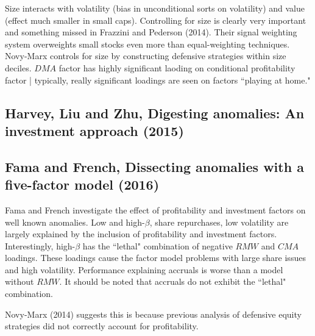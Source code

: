 Size interacts with volatility (bias in unconditional sorts on volatility) and value
(effect much smaller in small caps). Controlling for size is clearly very important and
something missed in Frazzini and Pederson (2014). Their signal weighting system
overweights small stocks even more than equal-weighting techniques. Novy-Marx controls for
size by constructing defensive strategies within size deciles. $DMA$ factor has highly
significant laoding on conditional profitability factor | typically, really significant
loadings are seen on factors ``playing at home."

\subsection[Harvey, Liu and Zhu, 2015]{Harvey, Liu and Zhu, Digesting anomalies: An investment approach (2015)\cite{harvey2015digesting}}

\subsection[Fama and French, 2016]{Fama and French, Dissecting anomalies with a five-factor model (2016)\cite{fama2016dissecting}}

Fama and French investigate the effect of profitability and investment factors on well
known anomalies. Low and high-$\beta$, share repurchases, low volatility are largely
explained by the inclusion of profitability and investment factors. Interestingly,
high-$\beta$ has the ``lethal" combination of negative $RMW$ and $CMA$ loadings. These
loadings cause the factor model problems with large share issues and high volatility.
Performance explaining accruals is worse than a model without $RMW$. It should be noted
that accruals do not exhibit the ``lethal" combination.

Novy-Marx (2014)\cite{novy2014understanding} suggests this is because previous analysis of
defensive equity strategies did not correctly account for profitability.
